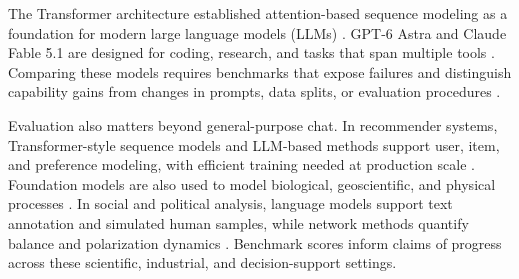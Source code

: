 \documentclass[11pt]{article}
\begin{document}
The Transformer architecture established attention-based sequence modeling as a foundation for modern large language models (LLMs) \citep{vaswani2017attention}. GPT-6 Astra and Claude Fable 5.1 are designed for coding, research, and tasks that span multiple tools \citep{openai2026gpt6astra,anthropic2026fable51}. Comparing these models requires benchmarks that expose failures and distinguish capability gains from changes in prompts, data splits, or evaluation procedures \citep{hendrycks2021mmlu,rein2023gpqa,phan2025hle,shang2026llm}.

Evaluation also matters beyond general-purpose chat. In recommender systems, Transformer-style sequence models and LLM-based methods support user, item, and preference modeling, with efficient training needed at production scale \citep{kang2018selfattentive,sun2019bert4rec,shang2026erase}. Foundation models are also used to model biological, geoscientific, and physical processes \citep{theodoris2023transfer,cui2024scgpt,shang2025predicting,zhang2025genetic,wu2024diurnal}. In social and political analysis, language models support text annotation and simulated human samples, while network methods quantify balance and polarization dynamics \citep{leskovec2010signed,gilardi2023chatgpt,argyle2023out,li2026matraix,ng2026microverse,shang2026inference}. Benchmark scores inform claims of progress across these scientific, industrial, and decision-support settings.
\end{document}
